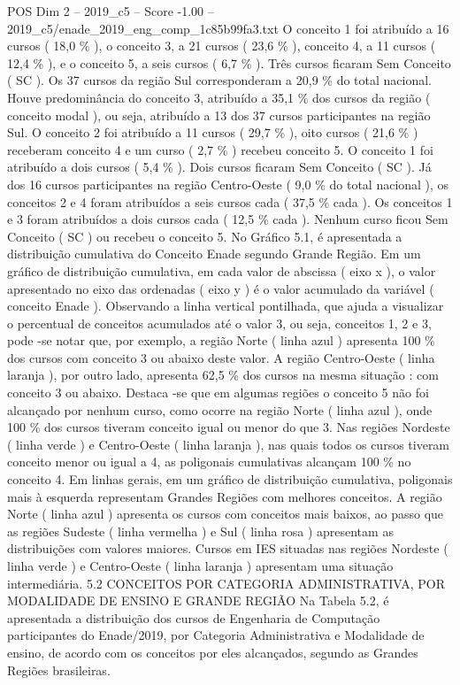 \begin{textsample}{POS Dim 2 – 2019\_c5 – Score -1.00 – 2019\_c5/enade\_2019\_eng\_comp\_1c85b99fa3.txt}
O conceito 1 foi atribuído a 16 cursos ( 18,0 \% ), o conceito 3, a 21 cursos ( 23,6 \% ), conceito 4, a 11 cursos ( 12,4 \% ), e o conceito 5, a seis cursos ( 6,7 \% ).
Três cursos ficaram Sem Conceito ( SC ).
Os 37 cursos da região Sul corresponderam a 20,9 \% do total nacional.
Houve predominância do conceito 3, atribuído a 35,1 \% dos cursos da região ( conceito modal ), ou seja, atribuído a 13 dos 37 cursos participantes na região Sul.
O conceito 2 foi atribuído a 11 cursos ( 29,7 \% ), oito cursos ( 21,6 \% ) receberam conceito 4 e um curso ( 2,7 \% ) recebeu conceito 5.
O conceito 1 foi atribuído a dois cursos ( 5,4 \% ).
Dois cursos ficaram Sem Conceito ( SC ).
Já dos 16 cursos participantes na região Centro-Oeste ( 9,0 \% do total nacional ), os conceitos 2 e 4 foram atribuídos a seis cursos cada ( 37,5 \% cada ).
Os conceitos 1 e 3 foram atribuídos a dois cursos cada ( 12,5 \% cada ).
Nenhum curso ficou Sem Conceito ( SC ) ou recebeu o conceito 5.
No Gráfico 5.1, é apresentada a distribuição cumulativa do Conceito Enade segundo Grande Região.
Em um gráfico de distribuição cumulativa, em cada valor de abscissa ( eixo x ), o valor apresentado no eixo das ordenadas ( eixo y ) é o valor acumulado da variável ( conceito Enade ).
Observando a linha vertical pontilhada, que ajuda a visualizar o percentual de conceitos acumulados até o valor 3, ou seja, conceitos 1, 2 e 3, pode -se notar que, por exemplo, a região Norte ( linha azul ) apresenta 100 \% dos cursos com conceito 3 ou abaixo deste valor.
A região Centro-Oeste ( linha laranja ), por outro lado, apresenta 62,5 \% dos cursos na mesma situação : com conceito 3 ou abaixo.
Destaca -se que em algumas regiões o conceito 5 não foi alcançado por nenhum curso, como ocorre na região Norte ( linha azul ), onde 100 \% dos cursos tiveram conceito igual ou menor do que 3.
Nas regiões Nordeste ( linha verde ) e Centro-Oeste ( linha laranja ), nas quais todos os cursos tiveram conceito menor ou igual a 4, as poligonais cumulativas alcançam 100 \% no conceito 4.
Em linhas gerais, em um gráfico de distribuição cumulativa, poligonais mais à esquerda representam Grandes Regiões com melhores conceitos.
A região Norte ( linha azul ) apresenta os cursos com conceitos mais baixos, ao passo que as regiões Sudeste ( linha vermelha ) e Sul ( linha rosa ) apresentam as distribuições com valores maiores.
Cursos em IES situadas nas regiões Nordeste ( linha verde ) e Centro-Oeste ( linha laranja ) apresentam uma situação intermediária. 5.2 CONCEITOS POR CATEGORIA ADMINISTRATIVA, POR MODALIDADE DE ENSINO E GRANDE REGIÃO Na Tabela 5.2, é apresentada a distribuição dos cursos de Engenharia de Computação participantes do Enade/2019, por Categoria Administrativa e Modalidade de ensino, de acordo com os conceitos por eles alcançados, segundo as Grandes Regiões brasileiras.

\end{textsample}
